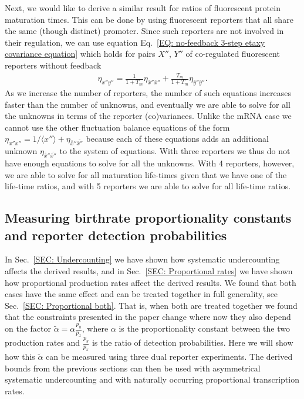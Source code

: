 \documentclass[%
 reprint,prx,
superscriptaddress,
%
%
%
%
%
%
%
%
%
 amsmath,amssymb,
 aps,
%
%
%
%
%
%
]{revtex4-2}
\begin{document}
{{Next, we would like to derive a similar result for ratios of fluorescent protein maturation times. This can be done by using fluorescent reporters that all share the same (though distinct) promoter. Since such reporters are not involved in their regulation, we can use equation Eq.~\eqref{EQ: no-feedback 3-step etaxy covariance equation} which holds for pairs $X''$, $Y''$ of co-regulated fluorescent reporters without feedback 
\begin{align*}
\eta_{x''y''} = \frac{1}{1+T_{m}}\eta_{\bar{x}''\bar{x}''} + \frac{T_{m}}{1 + T_{m}}\eta_{\bar{y}''\bar{y}''} .
\end{align*}
As we increase the number of reporters, the number of such equations increases faster than the number of unknowns, and eventually we are able to solve for all the unknowns in terms 
of the reporter (co)variances. Unlike the mRNA case we cannot use the other fluctuation balance equations of the form $\eta_{x''x''} = 1/\langle x'' \rangle + \eta_{\bar{\bar{x}}''\bar{\bar{x}''}}$ because 
each of these equations adds an additional unknown $\eta_{\bar{\bar{x}}''\bar{\bar{x}''}}$ to the system of equations. With three reporters we thus do not have enough equations to solve for all the unknowns. 
With 4 reporters, however, we are able to solve for all maturation life-times given that we have one of the life-time ratios, and with 5 reporters we are able to solve for all life-time ratios. \\





\subsection{Measuring birthrate proportionality constants and reporter detection probabilities} 
\label{SEC: Measuring alpha and detection probabilities}

In Sec.~\ref{SEC: Undercounting} we have shown how systematic undercounting affects the derived results, and in Sec.~\ref{SEC: Proportional rates} we have shown how proportional production rates affect the derived results. We found that both cases have the same effect and can be treated together in full generality, see Sec.~\ref{SEC: Proportional both}. That is, when both are treated together we found that the constraints presented in the paper change where now they also depend on the factor $\tilde{\alpha} = \alpha\frac{p_{y}}{p_{x}}$, where $\alpha$ is the proportionality constant between the two production rates and $\frac{p_{y}}{p_{x}}$ is the ratio of detection probabilities. Here we will show how this $\tilde{\alpha}$ can be measured using three dual reporter experiments. The derived bounds from the previous sections can then be used with asymmetrical systematic undercounting and with naturally occurring proportional transcription rates.   

}}
\end{document}
